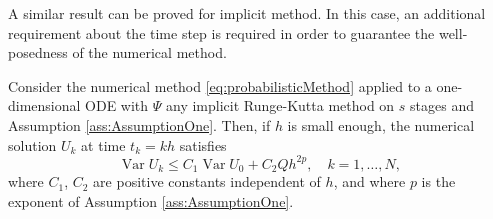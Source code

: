 \documentclass{siamart1116}
\numberwithin{theorem}{section}
\newcommand{\Var}{\operatorname{Var}}
\begin{document}
A similar result can be proved for implicit method. In this case, an additional requirement about the time step is required in order to guarantee the well-posedness of the numerical method.

\begin{lemma}\label{lem:VarianceImplicit} Consider the numerical method \eqref{eq:probabilisticMethod} applied to a one-dimensional ODE with $\Psi$ any implicit Runge-Kutta method on $s$ stages and Assumption \ref{ass:AssumptionOne}. Then, if $h$ is small enough, the numerical solution $U_k$ at time $t_k = kh$ satisfies
	\begin{equation}\label{eq:BoundLemmaImplicit}
		\Var U_k \leq C_1\Var U_0 + C_2Q h^{2p}, \quad k = 1, \ldots, N,
	\end{equation}
	where $C_1$, $C_2$ are positive constants independent of $h$, and where $p$ is the exponent of Assumption \ref{ass:AssumptionOne}.
\end{lemma}
\end{document}
